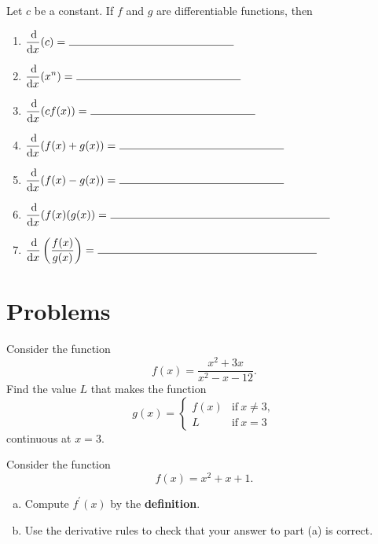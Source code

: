 \documentclass[12pt]{amsart}
\begin{document}
\begin{thm}[7 Points]
  Let \(c\) be a constant.
  If \(f\) and \(g\) are differentiable functions, then
  \begin{enumerate}
  \item
    \(\displaystyle{\frac{\dif}{\dif x}(c) =\ \line(1,0){150}}\)
    \vspace{.25in}
  \item
    \(\displaystyle{\frac{\dif}{\dif x}(x^n) =\ \line(1,0){150}}\)
    \vspace{.25in}
  \item
    \(\displaystyle{\frac{\dif}{\dif x}(cf(x)) =\ \line(1,0){150}}\)
    \vspace{.25in}
  \item
    \(\displaystyle{\frac{\dif}{\dif x}(f(x) + g(x)) =\ \line(1,0){150}}\)
    \vspace{.25in}
  \item
    \(\displaystyle{\frac{\dif}{\dif x}(f(x) - g(x)) =\ \line(1,0){150}}\)
    \vspace{.25in}
  \item
    \(\displaystyle{\frac{\dif}{\dif x}(f(x)(g(x)) =\ \line(1,0){200}}\)
    \vspace{.25in}
  \item
    \(\displaystyle{\frac{\dif}{\dif x}\left(\frac{f(x)}{g(x)}\right) =\ \line(1,0){200}}\)
  \end{enumerate}
\end{thm}

\section*{Problems}
\begin{thm}[10 Points]
   Consider the function
  \[f(x) = \frac{x^2 + 3x}{x^2 - x - 12}.\]
    Find the value \(L\) that makes the function
    \[g(x) = \left\{\begin{matrix}
    f(x) & \text{if}\ x \neq 3,\\
    L & \text{if}\ x = 3
    \end{matrix}
    \right.\]
    continuous at \(x = 3\).
\end{thm}

\begin{thm}[10 Points]
  Consider the function
  \[f(x) = x^2 + x + 1.\]
  \begin{enumerate}[(a)]
  \item
    Compute \(f^\prime(x)\) by the \textbf{definition}.
  \item
    Use the derivative rules to check that your answer to part (a) is correct.
  \end{enumerate}
\end{thm}
\end{document}
